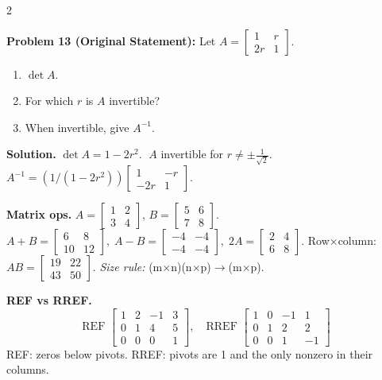 \documentclass[8pt]{extarticle}
\begin{document}
\begin{multicols}{2}
\begin{tcolorbox}[title=]
\noindent
\textbf{Problem 13 (Original Statement):}
Let
\(A=\begin{bmatrix}1&r\\2r&1\end{bmatrix}\).
\begin{enumerate}
\item[(a)] \(\det A\).
\item[(b)] For which \(r\) is \(A\) invertible?
\item[(c)] When invertible, give \(A^{-1}\).
\end{enumerate}

\textbf{Solution.}
\(\det A=1-2r^{2}\).
\(\;A\) invertible for \(r\neq\pm\frac{1}{\sqrt{2}}\).
\(
A^{-1}=(1/(1-2r^{2}))\begin{bmatrix}1&-r\\-2r&1\end{bmatrix}.
\)
\end{tcolorbox}

\begin{tcolorbox}[title={Quick Reference -- Matrix Ops, REF/RREF, Rank/Det, Solving $A\vec x=\vec b$}, colframe=black!60!white, colback=gray!2]
\scriptsize
\textbf{Matrix ops.}
\(A=\begin{bmatrix}1&2\\3&4\end{bmatrix},\,B=\begin{bmatrix}5&6\\7&8\end{bmatrix}\).
\(
A+B=\begin{bmatrix}6&8\\10&12\end{bmatrix},\;
A-B=\begin{bmatrix}-4&-4\\-4&-4\end{bmatrix},\;
2A=\begin{bmatrix}2&4\\6&8\end{bmatrix}.
\)
Row\(\times\)column:
\(
AB=\begin{bmatrix}19&22\\43&50\end{bmatrix}.
\)
\emph{Size rule: }(m$\times$n)(n$\times$p)$\to$(m$\times$p).

\textbf{REF vs RREF.}
\[
\text{REF } \left[\!\begin{array}{ccc|c}1&2&-1&3\\0&1&4&5\\0&0&0&1\end{array}\!\right],\quad
\text{RREF } \left[\!\begin{array}{ccc|c}1&0&-1&1\\0&1&2&2\\0&0&1&-1\end{array}\!\right]
\]
REF: zeros below pivots. RREF: pivots are 1 and the only nonzero in their columns.


\end{tcolorbox}
\end{multicols}
\end{document}
